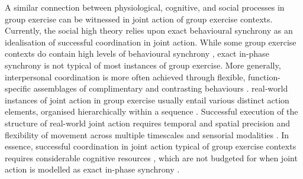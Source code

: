 \begin{CJK}{UTF8}{gbsn}
A similar connection between physiological, cognitive, and social processes in group exercise can be witnessed in joint action of group exercise contexts.  Currently, the social high theory relies upon exact behavioural synchrony as an idealisation of successful coordination in joint action.  While some group exercise contexts do contain high levels of behavioural synchrony \citep[rowing, synchronised swimming, diving, mass calisthenics, and forms of dance such as ballet, see][]{McNeill1995}, exact in-phase synchrony is not typical of most instances of group exercise.  More generally, interpersonal coordination is more often achieved through flexible, function-specific assemblages of complimentary and contrasting behaviours \citep[for example, coordination in an interactional team sport, a dyadic conversation, or an ensemble music performance, see][]{Fusaroli2014}.  real-world instances of joint action in group exercise usually entail various distinct action elements, organised hierarchically within a sequence \citep{Schmidt1975,Rosenbaum2009}.  Successful execution of the structure of real-world joint action requires temporal and spatial precision and flexibility of movement across multiple timescales and sensorial modalities \citep{Sebanz2006}.  In essence, successful coordination in joint action typical of group exercise contexts requires considerable cognitive resources \citep{Turvey1978}, which are not budgeted for when joint action is modelled as exact in-phase synchrony \citep{Keller2014}.



\end{CJK}
